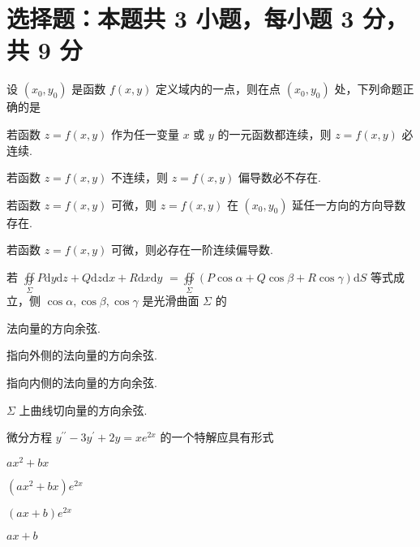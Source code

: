 \section{选择题：本题共 3 小题，每小题 3 分，共 9 分}

\begin{question}[points = 3]
    设 $(x_0, y_0)$ 是函数 $f(x, y)$ 定义域内的一点，则在点 $(x_0, y_0)$ 处，下列命题正确的是 \paren[]
\end{question}
\begin{choices}
    \item 若函数 $z = f(x, y)$ 作为任一变量 $x$ 或 $y$ 的一元函数都连续，则 $z = f(x, y)$ 必连续.
    \item 若函数 $z = f(x, y)$ 不连续，则 $z = f(x, y)$ 偏导数必不存在.
    \item 若函数 $z = f(x, y)$ 可微，则 $z = f(x, y)$ 在 $(x_0, y_0)$ 延任一方向的方向导数存在.
    \item 若函数 $z = f(x, y)$ 可微，则必存在一阶连续偏导数.
\end{choices}

\begin{question}[points = 3]
    若 $\oiint\limits_\Sigma P\mathrm{d}y\mathrm{d}z + Q\mathrm{d}z\mathrm{d}x + R\mathrm{d}x\mathrm{d}y$
    $= \oiint\limits_\Sigma (P\cos{\alpha} + Q\cos{\beta} + R\cos{\gamma})\mathrm{d}S$ 等式成立，侧 $\cos{\alpha}, \cos{\beta}, \cos{\gamma}$ 是光滑曲面 $\Sigma$ 的 \paren[]
\end{question}
\begin{choices}
    \item 法向量的方向余弦.
    \item 指向外侧的法向量的方向余弦.
    \item 指向内侧的法向量的方向余弦.
    \item $\Sigma$ 上曲线切向量的方向余弦.
\end{choices}

\begin{question}[points = 3]
    微分方程 $y^{\prime\prime} - 3y^{\prime} + 2y = xe^{2x}$ 的一个特解应具有形式 \paren[]
\end{question}
\begin{choices}
    \item $ax^2 + bx$
    \item $(ax^2 + bx)e^{2x}$
    \item $(ax + b)e^{2x}$
    \item $ax + b$
\end{choices}

